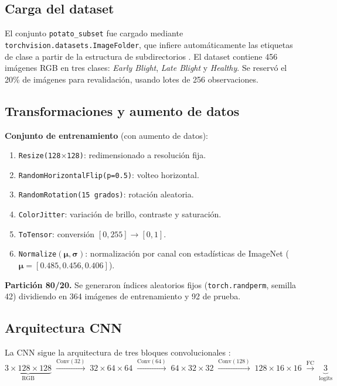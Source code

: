 \documentclass[12pt, a4paper]{article}
\begin{document}
\subsection{Carga del dataset}

El conjunto \texttt{potato\_subset} fue cargado mediante
\texttt{torchvision.datasets.ImageFolder}, que infiere automáticamente
las etiquetas de clase a partir de la estructura de subdirectorios
\citep[Sec.~10.9.3]{islp2023}. El dataset contiene 456 imágenes RGB
en tres clases: \textit{Early Blight}, \textit{Late Blight} y
\textit{Healthy}. Se reservó el 20\% de imágenes para revalidación,
usando lotes de 256 observaciones.

\subsection{Transformaciones y aumento de datos}

\textbf{Conjunto de entrenamiento} (con aumento de datos):
\begin{enumerate}
  \item \texttt{Resize(128$\times$128)}: redimensionado a resolución fija.
  \item \texttt{RandomHorizontalFlip(p=0.5)}: volteo horizontal.
  \item \texttt{RandomRotation(15 grados)}: rotación aleatoria.
  \item \texttt{ColorJitter}: variación de brillo, contraste y saturación.
  \item \texttt{ToTensor}: conversión $[0,255] \to [0,1]$.
  \item \texttt{Normalize}$(\bm{\mu}, \bm{\sigma})$: normalización por canal
    con estadísticas de ImageNet ($\bm{\mu} = [0.485, 0.456, 0.406]$).
\end{enumerate}

\textbf{Partición 80/20.} Se generaron índices aleatorios fijos
(\texttt{torch.randperm}, semilla 42) dividiendo en 364 imágenes de
entrenamiento y 92 de prueba.

\subsection{Arquitectura CNN}

La CNN sigue la arquitectura de tres bloques convolucionales
\citep[Sec.~10.3.3]{islp2023}:
\begin{equation}
  \underbrace{3{\times}128{\times}128}_{\text{RGB}}
  \;\xrightarrow{\mathrm{Conv}(32)}\;
  32{\times}64{\times}64
  \;\xrightarrow{\mathrm{Conv}(64)}\;
  64{\times}32{\times}32
  \;\xrightarrow{\mathrm{Conv}(128)}\;
  128{\times}16{\times}16
  \;\xrightarrow{\text{FC}}\;
  \underbrace{3}_{\text{logits}}
  \label{eq:cnn_arch}
\end{equation}
\end{document}
